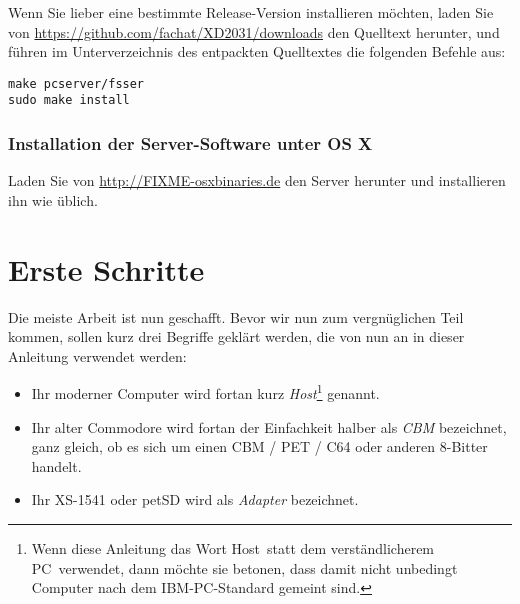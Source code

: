 \documentclass[10pt,a4paper]{scrartcl}		%
\newcommand{\osxbinaries}{http://FIXME-osxbinaries.de}
\begin{document}
Wenn Sie lieber eine bestimmte Release-Version installieren möchten, 
laden Sie von 
\url{https://github.com/fachat/XD2031/downloads}
den Quelltext herunter, und führen im Unterverzeichnis des
entpackten Quelltextes die folgenden Befehle aus:

\begin{lstlisting}
make pcserver/fsser
sudo make install
\end{lstlisting}

\subsubsection{Installation der Server-Software unter OS X}
Laden Sie von \url{\osxbinaries} den Server herunter und installieren ihn 
wie üblich.

\section{Erste Schritte}
Die meiste Arbeit ist nun geschafft. Bevor wir nun zum vergnüglichen
Teil kommen, sollen kurz drei Begriffe geklärt werden, die von nun
an in dieser Anleitung verwendet werden:
\begin{itemize}
\item Ihr moderner Computer wird fortan kurz \textit{Host}\footnote
	{Wenn diese Anleitung das Wort \glqq Host\grqq\ statt dem 
	verständlicherem \glqq PC\grqq\ verwendet, dann möchte sie betonen, 
	dass damit nicht unbedingt Computer nach dem IBM-PC-Standard 
	gemeint sind.}
genannt.
\item Ihr alter Commodore wird fortan der Einfachkeit halber als 
\textit{CBM} bezeichnet, ganz gleich, ob es sich um einen CBM / PET / C64 
oder anderen 8-Bitter handelt.
\item Ihr XS-1541 oder petSD wird als \textit{Adapter} bezeichnet.
\end{itemize}
\end{document}
